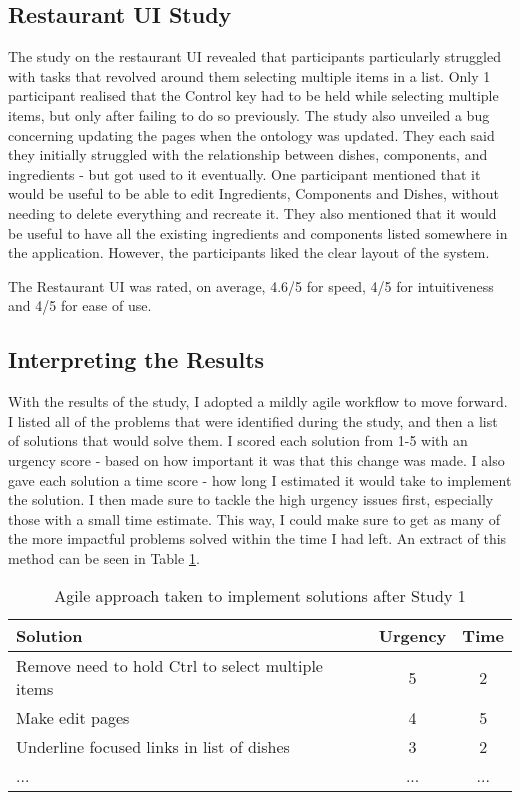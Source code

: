 \subsection{Restaurant UI Study}

The study on the restaurant UI revealed that participants particularly struggled with tasks that revolved around them selecting multiple items in a list. Only 1 participant realised that the Control key had to be held while selecting multiple items, but only after failing to do so previously. The study also unveiled a bug concerning updating the pages when the ontology was updated. They each said they initially struggled with the relationship between dishes, components, and ingredients - but got used to it eventually. One participant mentioned that it would be useful to be able to edit Ingredients, Components and Dishes, without needing to delete everything and recreate it. They also mentioned that it would be useful to have all the existing ingredients and components listed somewhere in the application. However, the participants liked the clear layout of the system. 

The Restaurant UI was rated, on average, 4.6/5 for speed, 4/5 for intuitiveness and 4/5 for ease of use.

\subsection{Interpreting the Results}

With the results of the study, I adopted a mildly agile workflow to move forward. I listed all of the problems that were identified during the study, and then a list of solutions that would solve them. I scored each solution from 1-5 with an urgency score - based on how important it was that this change was made. I also gave each solution a time score - how long I estimated it would take to implement the solution. I then made sure to tackle the high urgency issues first, especially those with a small time estimate. This way, I could make sure to get as many of the more impactful problems solved within the time I had left. An extract of this method can be seen in Table \ref{tab:agile}.

\begin{table}[h]
\centering
\begin{tabular}{ |l|c|c| }
\hline
\textbf{Solution} & \textbf{Urgency} & \textbf{Time}\\
\hline
Remove need to hold Ctrl to select multiple items & 5 & 2 \\
\hline
Make edit pages & 4 & 5 \\
\hline
Underline focused links in list of dishes & 3 & 2 \\
\hline
... &  ... & ... \\
\hline
\end{tabular}
\caption{Agile approach taken to implement solutions after Study 1}
\label{tab:agile}
\end{table}


